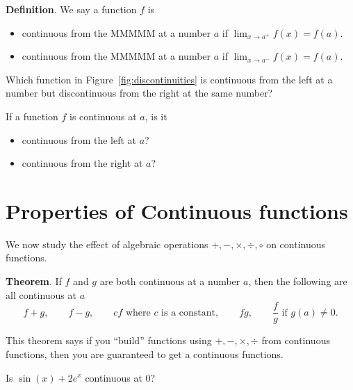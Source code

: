 \documentclass[../main.tex]{subfiles}
\begin{document}
\begin{mdframed}[style=withref]
  \textbf{Definition}. We say a function \(f\) is 
  \begin{itemize}
    \item continuous from the {MMMMM} at a number \(a\) if \(\lim_{{x \to a^{+}}} f(x) = f(a)\).
    \item continuous from the {MMMMM} at a number \(a\) if \(\lim_{{x \to a^{-}}} f(x) = f(a)\).
  \end{itemize}

\end{mdframed}

\begin{example}
  Which function in Figure~\ref{fig:discontinuities} is continuous from the left at a number but discontinuous from the right at the same number?
\end{example}
\vspace{2in}

\begin{example}
  If a function \(f\) is continuous at \(a\), is it
  \begin{itemize}
  \item continuous from the left at \(a\)?
  \item continuous from the right at \(a\)?
  \end{itemize}
\end{example}
\vfill

\section{Properties of Continuous functions}
We now study the effect of algebraic operations \(+, -, \times, \div, \circ\) on continuous functions.

\begin{mdframed}[style=withref]
  \textbf{Theorem}. If \(f\) and \(g\) are {both continuous at a number \(a\)}, then the following are all {continuous at \(a\)}
  \[
    f + g, \qquad f - g, \qquad cf \text{ where \(c\) is a constant}, \qquad fg, \qquad \frac{f}{g} \text{ if } g(a) \ne 0.
  \]
  
\end{mdframed}
This theorem says if you ``build'' functions using \(+, -, \times, \div\) from continuous functions, then you are guaranteed to get a continuous functions. 

\clearpage
\begin{example}
  Is \(\sin(x) + 2e^{x}\) continuous at \(0\)?
\end{example}
\vspace{1.5in}
\end{document}
